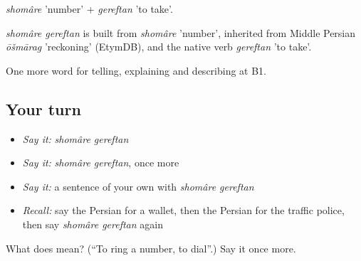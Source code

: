 \emph{shomâre} 'number' + \emph{gereftan} 'to take'.

\begin{cousinweb}
\emph{shomâre gereftan} is built from \emph{shomâre} 'number', inherited from Middle Persian \emph{ōšmārag} 'reckoning' (EtymDB), and the native verb \emph{gereftan} 'to take'.
\end{cousinweb}

\begin{grammarlens}[title={What you've built}]
One more word for telling, explaining and describing at B1.
\end{grammarlens}

\subsection*{Your turn}
\begin{itemize}
\raggedright
  \item \emph{Say it:} \emph{shomâre gereftan}
  \item \emph{Say it:} \emph{shomâre gereftan}, once more
  \item \emph{Say it:} a sentence of your own with \emph{shomâre gereftan}
  \item \emph{Recall:} say the Persian for a wallet, then the Persian for the traffic police, then say \emph{shomâre gereftan} again
\end{itemize}

\begin{tcolorbox}[breakable,colback=teal!4,colframe=teal!35!black,title={Before you move on}]
What does   mean? (\textquotedblleft{}To ring a number, to dial\textquotedblright{}.) Say it once more.
\end{tcolorbox}
